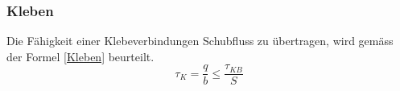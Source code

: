 
  \subsubsection{Kleben}
  Die Fähigkeit einer Klebeverbindungen Schubfluss zu übertragen, wird gemäss der Formel \ref{Kleben} beurteilt.
  \begin{equation}
    \label{Kleben}
    \tau_K = \frac{q}{b} \leq \frac{\tau_{KB}}{S}
  \end{equation}


\newpage
